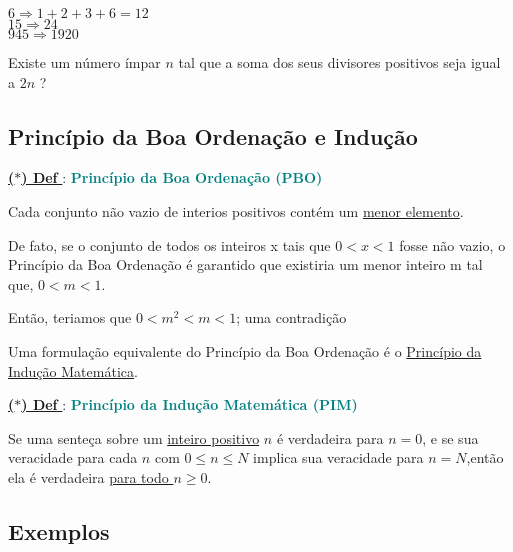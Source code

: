 \begin{exemplo}
$6 \Rightarrow 1 + 2 + 3 + 6 = 12$ \\
$15 \Rightarrow 24$ \\
$945 \Rightarrow 1920$
\end{exemplo}

\begin{questao}
Existe um número ímpar $n$ tal que a soma dos seus divisores positivos seja igual a $2n$ ?
\end{questao}

\subsection*{Princípio da Boa Ordenação e Indução}

\noindent\underline{\underline{\textbf{($\ast$) Def }}} : \textbf{\textcolor{teal}{Princípio da Boa Ordenação (PBO)}}

\noindent Cada conjunto não vazio de interios positivos contém um \underline{menor elemento}.

\begin{exemplo}
De fato, se o conjunto de todos os inteiros x tais que $0 < x < 1$ fosse não vazio,
o Princípio da Boa Ordenação é garantido que existiria um menor inteiro m tal que,
$0 < m < 1$.

Então, teriamos que $0 < m^2 < m < 1$; uma contradição
\end{exemplo}

\vspace{0.05cm}
\noindent Uma formulação equivalente do Princípio da Boa Ordenação é o \underline{Princípio da Indução Matemática}.
\vspace{0.05cm}

\noindent\underline{\underline{\textbf{($\ast$) Def }}} : \textbf{\textcolor{teal}{Princípio da Indução Matemática (PIM)}}

\noindent Se uma senteça sobre um \underline{inteiro positivo} $n$ é verdadeira para $n = 0$, e se sua veracidade 
para cada $n$ com \underline{$0 \leq n \leq N$} implica sua veracidade para \underline{$n = N$},então ela é verdadeira \underline{para todo $n \geq 0$}. 

\subsection*{Exemplos}

